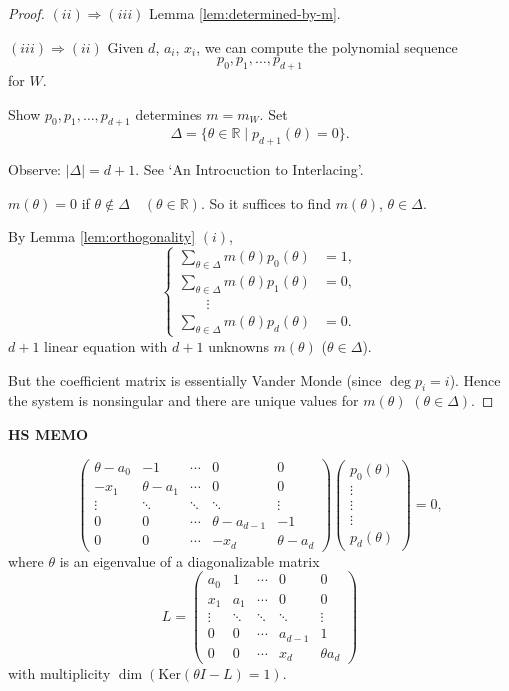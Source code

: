 \documentclass[
]{book}
\theoremstyle{definition}
\theoremstyle{definition}
\theoremstyle{definition}
\theoremstyle{definition}
\theoremstyle{remark}
\begin{document}
\begin{proof}
\((ii)\Rightarrow (iii)\) Lemma \ref{lem:determined-by-m}.

\((iii)\Rightarrow (ii)\)
Given \(d\), \(a_i\), \(x_i\), we can compute the polynomial sequence
\[p_0, p_1, \ldots, p_{d+1}\]
for \(W\).

Show \(p_0, p_1, \ldots, p_{d+1}\) determines \(m = m_W\). Set
\[\Delta = \{\theta\in \mathbb{R}\mid p_{d+1}(\theta) = 0\}.\]

Observe: \(|\Delta| = d+1\). See `An Introcuction to Interlacing'.

\(m(\theta) = 0\) if \(\theta\not\in\Delta\quad (\theta\in \mathbb{R})\). So it suffices to find \(m(\theta)\), \(\theta\in \Delta\).

By Lemma \ref{lem:orthogonality} \((i)\),
\[
\begin{cases}
\sum_{\theta\in\Delta} m(\theta)p_0(\theta) & = 1,\\
\sum_{\theta\in\Delta} m(\theta)p_1(\theta) & = 0,\\
\qquad \vdots & \\
\sum_{\theta\in\Delta} m(\theta)p_d(\theta) & = 0.
\end{cases}
\]
\(d+1\) linear equation with \(d+1\) unknowns \(m(\theta)\) (\(\theta\in \Delta\)).

But the coefficient matrix is essentially Vander Monde (since \(\deg p_i = i\)).
Hence the system is nonsingular and there are unique values for \(m(\theta)\) \((\theta\in \Delta)\).
\end{proof}

\textbf{HS MEMO}

\[\begin{pmatrix}
\theta-a_0 & -1 & \cdots & 0 & 0 \\
-x_1 & \theta - a_1  & \cdots & 0 & 0 \\
\vdots & \ddots  & \ddots & \ddots & \vdots \\
0 & 0 & \cdots & \theta-a_{d-1}  & -1\\
0 & 0 & \cdots & -x_d & \theta - a_d
\end{pmatrix}
\begin{pmatrix}
p_0(\theta)\\
\vdots\\
\vdots\\
\vdots\\
p_d(\theta)
\end{pmatrix} = 0,\]
where \(\theta\) is an eigenvalue of a diagonalizable matrix
\[
L = 
\begin{pmatrix}
a_0 & 1 & \cdots & 0 & 0 \\
x_1 & a_1  & \cdots & 0 & 0 \\
\vdots & \ddots  & \ddots & \ddots & \vdots \\
0 & 0 & \cdots & a_{d-1}  & 1\\
0 & 0 & \cdots & x_d & \theta a_d
\end{pmatrix}
\]
with multiplicity \(\dim (\mathrm{Ker}(\theta I - L) = 1)\).
\end{document}
